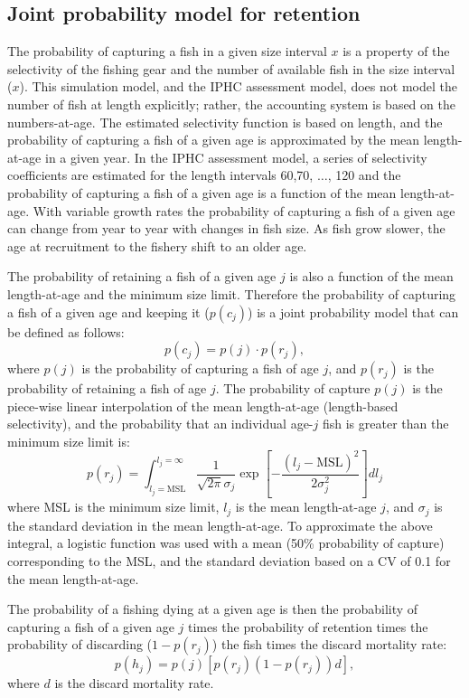 \subsection{Joint probability model for retention} %
\label{sub:joint_probability_model_for_retention}
The probability of capturing a fish in a given size interval $x$ is a property of the selectivity of the fishing gear and the number of available fish in the size interval ($x$).  This simulation model, and the IPHC assessment model, does not model the number of fish at length explicitly; rather, the accounting system is based on the numbers-at-age.  The estimated selectivity function is based on length, and the probability of capturing a fish of a given age is approximated by the mean length-at-age in a given year. In the IPHC assessment model, a series of selectivity coefficients are estimated for the length intervals 60,70, $\ldots$, 120 and the probability of capturing a fish of a given age is a function of the mean length-at-age. With variable growth rates the probability of capturing a fish of a given age can change from year to year with changes in fish size.  As fish grow slower, the age at recruitment to the fishery shift to an older age.

The probability of retaining a fish of a given age $j$ is also a function of the mean length-at-age and the minimum size limit.   Therefore the probability of capturing  a fish of a given age and keeping it ($p(c_j)$) is a joint probability model that can be defined as follows:
\[p(c_j) = p(j) \cdot p(r_j),\]
where $p(j)$ is the probability of capturing a fish of age $j$, and $p(r_j)$ is the probability of retaining a fish of age $j$.  The probability of capture $p(j)$ is the piece-wise linear interpolation of the mean length-at-age (length-based selectivity), and the probability that an individual age-$j$ fish is greater than the minimum size limit is:
\[p(r_j) = \int_{l_j=\mathrm{MSL}}^{l_j=\infty}
\frac{1}{\sqrt{2\pi}\sigma_j} \exp\left[-\frac{(l_j-\mathrm{MSL})^2}{2\sigma_j^2}  \right] dl_j
\]
where MSL is the minimum size limit, $l_j$ is the mean length-at-age $j$, and $\sigma_j$ is the standard deviation in the mean length-at-age.  To approximate the above integral, a logistic function was used with a mean (50\% probability of capture) corresponding to the MSL, and the standard deviation based on a CV of 0.1 for the mean length-at-age.

The probability of a fishing dying at a given age is then the probability of capturing a fish of a given age $j$ times the probability of retention times the probability of discarding ($1-p(r_j)$) the fish times the discard mortality rate:
\[
p(h_j) = p(j) [p(r_j) (1-p(r_j))d],
\]
where $d$ is the discard mortality rate.


